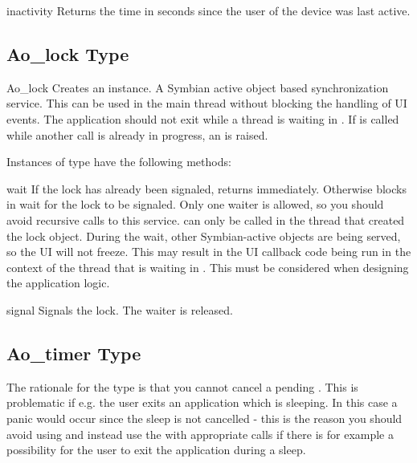 \begin{funcdesc}{inactivity}{}
Returns the time in seconds since the user of the device was last active.
\end{funcdesc}

\subsection{Ao_lock Type}
\label{subsec:Aolock}

\begin{classdesc}{Ao_lock}{}
Creates an  instance. A Symbian active object based 
synchronization service. This can be used in the main thread without 
blocking the handling of UI events. The application should not exit while a 
thread is waiting in . If  is called 
while another  call is already in progress, an  is raised.
\end{classdesc}

Instances of  type have the following methods:

\begin{methoddesc}[Ao_lock]{wait}{}
If the lock has already been signaled, returns immediately. Otherwise blocks 
in wait for the lock to be signaled. Only one waiter is allowed, so you 
should avoid recursive calls to this service.  can only be 
called in the thread that created the lock object. During the wait, other 
Symbian-active objects are being served, so the UI will not freeze. This may 
result in the UI callback code being run in the context of the thread that 
is waiting in . This must be considered when designing 
the application logic.
\end{methoddesc}

\begin{methoddesc}[Ao_lock]{signal}{}
Signals the lock. The waiter is released.
\end{methoddesc}

\subsection{Ao_timer Type}
\label{subsec:Aotimer}

The rationale for the  type is that you cannot cancel a 
pending . This is problematic if e.g. the user exits 
an application which is sleeping. In this case a panic would occur since the 
sleep is not cancelled - this is the reason you should avoid using 
 and instead use the  with 
appropriate  calls if there is for example a possibility for 
the user to exit the application during a sleep.

